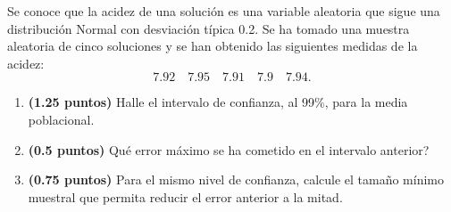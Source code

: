 
Se conoce que la acidez de una solución es una variable aleatoria que sigue una distribución Normal con desviación típica 0.2. Se ha tomado una muestra aleatoria de cinco soluciones y se han obtenido las siguientes medidas de la acidez:
\[
7.92\quad7.95\quad7.91\quad7.9\quad7.94.
\]
\begin{enumerate}[label=\alph*)]
\item \textbf{(1.25 puntos)} Halle el intervalo de confianza, al 99\%, para la media poblacional.
\item \textbf{(0.5 puntos)} \textquestiondown{}Qué error máximo se ha cometido en el intervalo anterior?
\item \textbf{(0.75 puntos)} Para el mismo nivel de confianza, calcule el tamaño mínimo muestral que permita reducir el error anterior a la mitad.
\end{enumerate}
